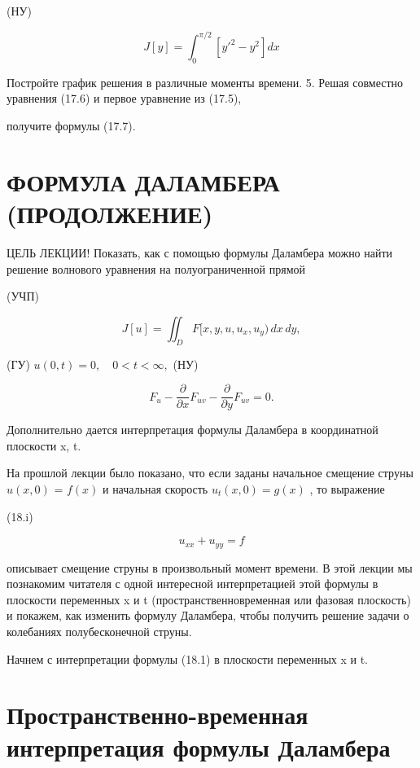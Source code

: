 \documentclass[
  ukrainian,
]{article}
\begin{document}
(НУ)

\[
J[y] = \int_{0}^{\pi/2} [y'^{2} - y^{2}] dx
\]

Постройте график решения в различные моменты времени. 5. Решая совместно
уравнения (17.6) и первое уравнение из (17.5),

получите формулы (17.7).

\section{ФОРМУЛА ДАЛАМБЕРА
(ПРОДОЛЖЕНИЕ)}\label{ux444ux43eux440ux43cux443ux43bux430-ux434ux430ux43bux430ux43cux431ux435ux440ux430-ux43fux440ux43eux434ux43eux43bux436ux435ux43dux438ux435}

ЦЕЛЬ ЛЕКЦИИ! Показать, как с помощью формулы Даламбера можно найти
решение волнового уравнения на полуограниченной прямой

(УЧП)

\[
J[u] = \iint_D F[x, y, u, u_x, u_y) \, dx \, dy,
\]

(ГУ) \(u(0, t) = 0, \quad 0 < t < \infty,\) (НУ)

\[
F_{u} - \frac{\partial}{\partial x} F_{uv} - \frac{\partial}{\partial y} F_{uv} = 0.
\]

Дополнительно дается интерпретация формулы Даламбера в координатной
плоскости x, t.

На прошлой лекции было показано, что если заданы начальное смещение
струны \(u(x, 0)\) = \(f(x)\) и начальная скорость \(u_t(x, 0) = g(x)\)
, то выражение

(18.i)

\[
u_{xx} + u_{yy} = f
\]

описывает смещение струны в произвольный момент времени. В этой лекции
мы познакомим читателя с одной интересной интерпретацией этой формулы в
плоскости переменных x и t (пространственновременная или фазовая
плоскость) и покажем, как изменить формулу Даламбера, чтобы получить
решение задачи о колебаниях полубесконечной струны.

Начнем с интерпретации формулы (18.1) в плоскости переменных x и t.

\section{Пространственно-временная интерпретация формулы
Даламбера}\label{ux43fux440ux43eux441ux442ux440ux430ux43dux441ux442ux432ux435ux43dux43dux43e-ux432ux440ux435ux43cux435ux43dux43dux430ux44f-ux438ux43dux442ux435ux440ux43fux440ux435ux442ux430ux446ux438ux44f-ux444ux43eux440ux43cux443ux43bux44b-ux434ux430ux43bux430ux43cux431ux435ux440ux430}
\end{document}
